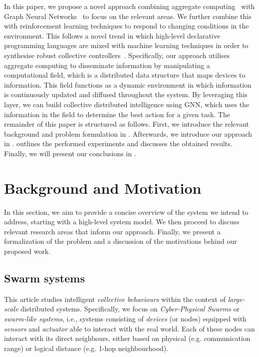 \documentclass[conference]{IEEEtran}
\begin{document}
In this paper, we propose a novel approach combining aggregate computing~\cite{Beal2015Computer} with Graph Neural Networks~\cite{Zhou2020AIOpen} to focus on the relevant areas. We further combine this with reinforcement learning techniques to respond to changing conditions in the environment. 
%
This follows a novel trend in which high-level declarative programming languages are mixed with machine learning techniques in order to synthesise robust collective controllers~\cite{DBLP:conf/acsos/Aguzzi21,DBLP:conf/icdcs/AguzziCV22,DBLP:conf/coordination/AguzziCV22}.
Specifically, 
 our approach utilises aggregate computing to disseminate information by manipulating a computational field, 
 which is a distributed data structure that maps devices to information. 
 This field functions as a dynamic environment in which information is continuously updated and diffused throughout the system. 
 By leveraging this layer, we can build collective distributed intelligence using \ac{GNN},
  which uses the information in the field to determine the best action for a given task.
The remainder of this paper is structured as follows. First, we introduce the relevant background and problem formulation in . Afterwards, we introduce our approach in .  outlines the performed experiments and discusses the obtained results. Finally, we will present our conclusions in .


\section{Background and Motivation}
\label{sec:background}
In this section, we aim to provide a concise overview of the system we intend to address, 
 starting with a high-level system model. 
%
We then proceed to discuss relevant research areas that inform our approach. 
%
Finally, we present a formalization of the problem and a discussion of the motivations behind our proposed work.
\subsection{Swarm systems}
This article studies intelligent \emph{collective behaviours} within the context of \emph{large-scale} distributed systems.
 Specifically, we focus on \emph{Cyber-Physical Swarms} or \emph{swarm-like systems}, i.e.,  systems consisting of \emph{devices} (or nodes) equipped with \emph{sensors} and \emph{actuator} able to interact with the real world.
 Each of these nodes can interact with its direct neighbours, either based on physical (e.g. communication range) or logical distance (e.g. 1-hop neighbourhood).
 
\end{document}
